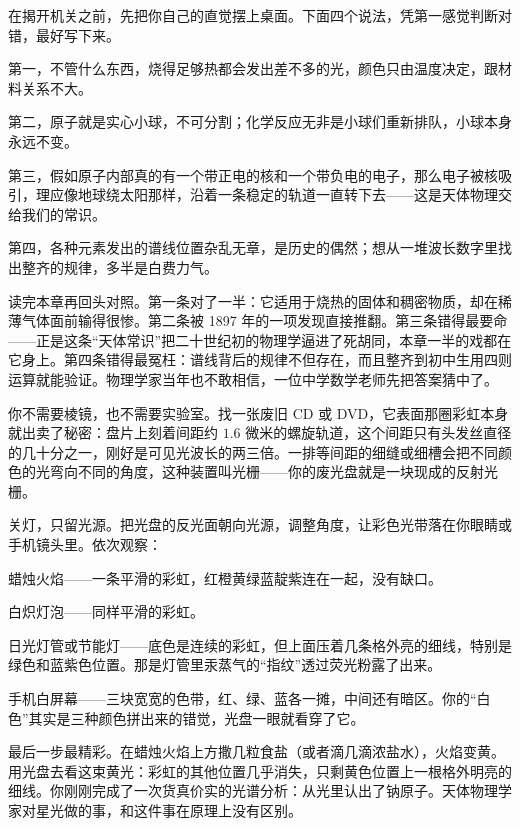 \begin{mainline}
在揭开机关之前，先把你自己的直觉摆上桌面。下面四个说法，凭第一感觉判断对错，最好写下来。

第一，不管什么东西，烧得足够热都会发出差不多的光，颜色只由温度决定，跟材料关系不大。

第二，原子就是实心小球，不可分割；化学反应无非是小球们重新排队，小球本身永远不变。

第三，假如原子内部真的有一个带正电的核和一个带负电的电子，那么电子被核吸引，理应像地球绕太阳那样，沿着一条稳定的轨道一直转下去——这是天体物理交给我们的常识。

第四，各种元素发出的谱线位置杂乱无章，是历史的偶然；想从一堆波长数字里找出整齐的规律，多半是白费力气。

读完本章再回头对照。第一条对了一半：它适用于烧热的固体和稠密物质，却在稀薄气体面前输得很惨。第二条被 1897 年的一项发现直接推翻。第三条错得最要命——正是这条“天体常识”把二十世纪初的物理学逼进了死胡同，本章一半的戏都在它身上。第四条错得最冤枉：谱线背后的规律不但存在，而且整齐到初中生用四则运算就能验证。物理学家当年也不敢相信，一位中学数学老师先把答案猜中了。
\end{mainline}


\begin{experiment}
你不需要棱镜，也不需要实验室。找一张废旧 CD 或 DVD，它表面那圈彩虹本身就出卖了秘密：盘片上刻着间距约 \(1.6\) 微米的螺旋轨道，这个间距只有头发丝直径的几十分之一，刚好是可见光波长的两三倍。一排等间距的细缝或细槽会把不同颜色的光弯向不同的角度，这种装置叫光栅——你的废光盘就是一块现成的反射光栅。

关灯，只留光源。把光盘的反光面朝向光源，调整角度，让彩色光带落在你眼睛或手机镜头里。依次观察：

蜡烛火焰——一条平滑的彩虹，红橙黄绿蓝靛紫连在一起，没有缺口。

白炽灯泡——同样平滑的彩虹。

日光灯管或节能灯——底色是连续的彩虹，但上面压着几条格外亮的细线，特别是绿色和蓝紫色位置。那是灯管里汞蒸气的“指纹”透过荧光粉露了出来。

手机白屏幕——三块宽宽的色带，红、绿、蓝各一摊，中间还有暗区。你的“白色”其实是三种颜色拼出来的错觉，光盘一眼就看穿了它。

最后一步最精彩。在蜡烛火焰上方撒几粒食盐（或者滴几滴浓盐水），火焰变黄。用光盘去看这束黄光：彩虹的其他位置几乎消失，只剩黄色位置上一根格外明亮的细线。你刚刚完成了一次货真价实的光谱分析：从光里认出了钠原子。天体物理学家对星光做的事，和这件事在原理上没有区别。
\end{experiment}

